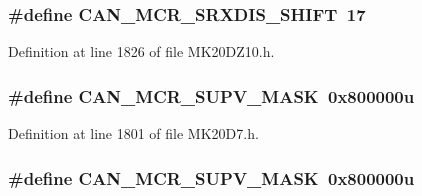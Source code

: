 \subsubsection[{\texorpdfstring{C\+A\+N\+\_\+\+M\+C\+R\+\_\+\+S\+R\+X\+D\+I\+S\+\_\+\+S\+H\+I\+FT}{CAN_MCR_SRXDIS_SHIFT}}]{\setlength{\rightskip}{0pt plus 5cm}\#define C\+A\+N\+\_\+\+M\+C\+R\+\_\+\+S\+R\+X\+D\+I\+S\+\_\+\+S\+H\+I\+FT~17}\hypertarget{group___c_a_n___register___masks_gae2513ad87a72bc6f2bb88be59a3e0836}{}\label{group___c_a_n___register___masks_gae2513ad87a72bc6f2bb88be59a3e0836}


Definition at line 1826 of file M\+K20\+D\+Z10.\+h.

\subsubsection[{\texorpdfstring{C\+A\+N\+\_\+\+M\+C\+R\+\_\+\+S\+U\+P\+V\+\_\+\+M\+A\+SK}{CAN_MCR_SUPV_MASK}}]{\setlength{\rightskip}{0pt plus 5cm}\#define C\+A\+N\+\_\+\+M\+C\+R\+\_\+\+S\+U\+P\+V\+\_\+\+M\+A\+SK~0x800000u}\hypertarget{group___c_a_n___register___masks_ga00521c6adbee738b0f73380052600203}{}\label{group___c_a_n___register___masks_ga00521c6adbee738b0f73380052600203}


Definition at line 1801 of file M\+K20\+D7.\+h.

\subsubsection[{\texorpdfstring{C\+A\+N\+\_\+\+M\+C\+R\+\_\+\+S\+U\+P\+V\+\_\+\+M\+A\+SK}{CAN_MCR_SUPV_MASK}}]{\setlength{\rightskip}{0pt plus 5cm}\#define C\+A\+N\+\_\+\+M\+C\+R\+\_\+\+S\+U\+P\+V\+\_\+\+M\+A\+SK~0x800000u}\hypertarget{group___c_a_n___register___masks_ga00521c6adbee738b0f73380052600203}{}\label{group___c_a_n___register___masks_ga00521c6adbee738b0f73380052600203}


